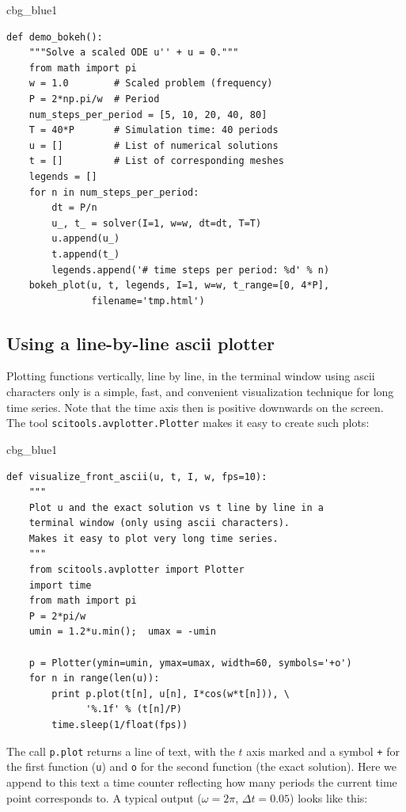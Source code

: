 \documentclass[%
oneside,                 %
final,                   %
10pt]{article}
\newenvironment{_cod_tight}[1]{
   \def\FrameCommand{\colorbox{#1}}
   \FrameRule0.6pt\MakeFramed {\FrameRestore}\vskip3mm}
   {\vskip0mm\endMakeFramed}
\newenvironment{cod}[1]{
\bgroup\rmfamily
\fboxsep=0mm\relax
\begin{_cod_tight}{#1}
\list{}{\parsep=-2mm\parskip=0mm\topsep=0pt\leftmargin=2mm
\rightmargin=2\leftmargin\leftmargin=4pt\relax}
\item\relax}
{\endlist\end{_cod_tight}\egroup}
\begin{document}
\begin{cod}{cbg_blue1}\begin{Verbatim}[numbers=none,fontsize=\fontsize{9pt}{9pt},baselinestretch=0.95,xleftmargin=2mm]
def demo_bokeh():
    """Solve a scaled ODE u'' + u = 0."""
    from math import pi
    w = 1.0        # Scaled problem (frequency)
    P = 2*np.pi/w  # Period
    num_steps_per_period = [5, 10, 20, 40, 80]
    T = 40*P       # Simulation time: 40 periods
    u = []         # List of numerical solutions
    t = []         # List of corresponding meshes
    legends = []
    for n in num_steps_per_period:
        dt = P/n
        u_, t_ = solver(I=1, w=w, dt=dt, T=T)
        u.append(u_)
        t.append(t_)
        legends.append('# time steps per period: %d' % n)
    bokeh_plot(u, t, legends, I=1, w=w, t_range=[0, 4*P],
               filename='tmp.html')
\end{Verbatim}
\end{cod}
\noindent

\subsection{Using a line-by-line ascii plotter}

Plotting functions vertically, line by line, in the terminal window
using ascii characters only is a simple, fast, and convenient
visualization technique for long time series. Note that the time
axis then is positive downwards on the screen.
The tool
\texttt{scitools.avplotter.Plotter} makes it easy to create such plots:

\begin{cod}{cbg_blue1}\begin{Verbatim}[numbers=none,fontsize=\fontsize{9pt}{9pt},baselinestretch=0.95,xleftmargin=2mm]
def visualize_front_ascii(u, t, I, w, fps=10):
    """
    Plot u and the exact solution vs t line by line in a
    terminal window (only using ascii characters).
    Makes it easy to plot very long time series.
    """
    from scitools.avplotter import Plotter
    import time
    from math import pi
    P = 2*pi/w
    umin = 1.2*u.min();  umax = -umin

    p = Plotter(ymin=umin, ymax=umax, width=60, symbols='+o')
    for n in range(len(u)):
        print p.plot(t[n], u[n], I*cos(w*t[n])), \ 
              '%.1f' % (t[n]/P)
        time.sleep(1/float(fps))
\end{Verbatim}
\end{cod}
\noindent
The call \texttt{p.plot} returns a line of text, with the $t$ axis marked and
a symbol \texttt{+} for the first function (\texttt{u}) and \texttt{o} for the second
function (the exact solution). Here we append to this text
a time counter reflecting how many periods the current time point
corresponds to. A typical output ($\omega =2\pi$, $\Delta t=0.05$)
looks like this:
\end{document}
